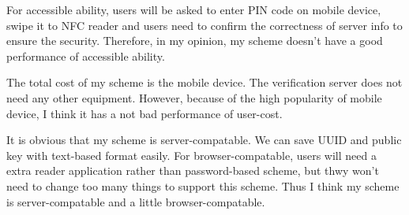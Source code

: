 \begin{CJK}{Bg5}{bsmi}
For accessible ability, users will be asked to enter PIN code on mobile device, swipe it to NFC reader and users need to confirm the correctness of server info to ensure the security. Therefore, in my opinion, my scheme doesn't have a good performance of accessible ability.

The total cost of my scheme is the mobile device. The verification server does not need any other equipment. However, because of the high popularity of mobile device, I think it has a not bad performance of user-cost.

It is obvious that my scheme is server-compatable. We can save UUID and public key with text-based format easily. For browser-compatable, users will need a extra reader application rather than password-based scheme, but thwy won't need to change too many things to support this scheme. Thus I think my scheme is server-compatable and a little browser-compatable. 

\end{CJK}